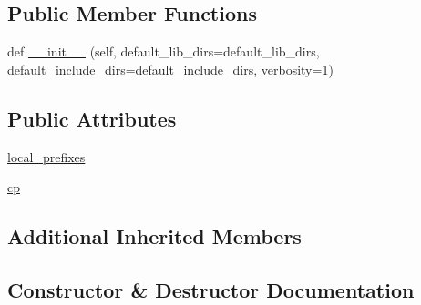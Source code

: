\subsection*{Public Member Functions}
\begin{DoxyCompactItemize}
\item 
def \hyperlink{classnumpy_1_1distutils_1_1tests_1_1test__system__info_1_1__system__info_aff5cfeeb2e0ebb05125d5d9a74ca6b93}{\+\_\+\+\_\+init\+\_\+\+\_\+} (self, default\+\_\+lib\+\_\+dirs=default\+\_\+lib\+\_\+dirs, default\+\_\+include\+\_\+dirs=default\+\_\+include\+\_\+dirs, verbosity=1)
\end{DoxyCompactItemize}
\subsection*{Public Attributes}
\begin{DoxyCompactItemize}
\item 
\hyperlink{classnumpy_1_1distutils_1_1tests_1_1test__system__info_1_1__system__info_a28eabac25cf79e4a0422507983585939}{local\+\_\+prefixes}
\item 
\hyperlink{classnumpy_1_1distutils_1_1tests_1_1test__system__info_1_1__system__info_aed36f6a87e4728813983b5b1899295b7}{cp}
\end{DoxyCompactItemize}
\subsection*{Additional Inherited Members}


\subsection{Constructor \& Destructor Documentation}
\mbox{\label{classnumpy_1_1distutils_1_1tests_1_1test__system__info_1_1__system__info_aff5cfeeb2e0ebb05125d5d9a74ca6b93}} 
